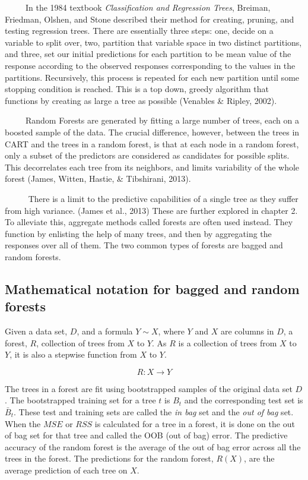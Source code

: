 \documentclass[12pt,twoside]{reedthesis}
\begin{document}
  ~~~~~In the 1984 textbook \emph{Classification and Regression Trees},
  Breiman, Friedman, Olshen, and Stone described their method for
  creating, pruning, and testing regression trees. There are essentially
  three steps: one, decide on a variable to split over, two, partition
  that variable space in two distinct partitions, and three, set our
  initial predictions for each partition to be mean value of the response
  according to the observed responses corresponding to the values in the
  partitions. Recursively, this process is repeated for each new partition
  until some stopping condition is reached. This is a top down, greedy
  algorithm that functions by creating as large a tree as possible
  (Venables \& Ripley, 2002).
  
  ~~~~~Random Forests are generated by fitting a large number of trees,
  each on a boosted sample of the data. The crucial difference, however,
  between the trees in CART and the trees in a random forest, is that at
  each node in a random forest, only a subset of the predictors are
  considered as candidates for possible splits. This decorrelates each
  tree from its neighbors, and limits variability of the whole forest
  (James, Witten, Hastie, \& Tibshirani, 2013).
  
  ~~~~~ There is a limit to the predictive capabilities of a single tree
  as they suffer from high variance. (James et al., 2013) These are
  further explored in chapter 2. To alleviate this, aggregate methods
  called forests are often used instead. They function by enlisting the
  help of many trees, and then by aggregating the responses over all of
  them. The two common types of forests are bagged and random forests.
  
  \subsection{Mathematical notation for bagged and random
  forests}\label{mathematical-notation-for-bagged-and-random-forests}
  
  Given a data set, \(D\), and a formula \(Y \sim X\), where \(Y\) and
  \(X\) are columns in \(D\), a forest, \(R\), collection of trees from
  \(X\) to \(Y\). As \(R\) is a collection of trees from \(X\) to \(Y\),
  it is also a stepwise function from \(X\) to \(Y\).
  
  \[R:X \rightarrow Y\]
  
  The trees in a forest are fit using bootstrapped samples of the original
  data set \(D\). The bootstrapped training set for a tree \(t\) is
  \(B_t\) and the corresponding test set is \(\bar{B}_t\). These test and
  training sets are called the \emph{in bag} set and the \emph{out of bag}
  set. When the \(MSE\) or \(RSS\) is calculated for a tree in a forest,
  it is done on the out of bag set for that tree and called the OOB (out
  of bag) error. The predictive accuracy of the random forest is the
  average of the out of bag error across all the trees in the forest. The
  predictions for the random forest, \(R(X)\), are the average prediction
  of each tree on \(X\).
  
\end{document}
